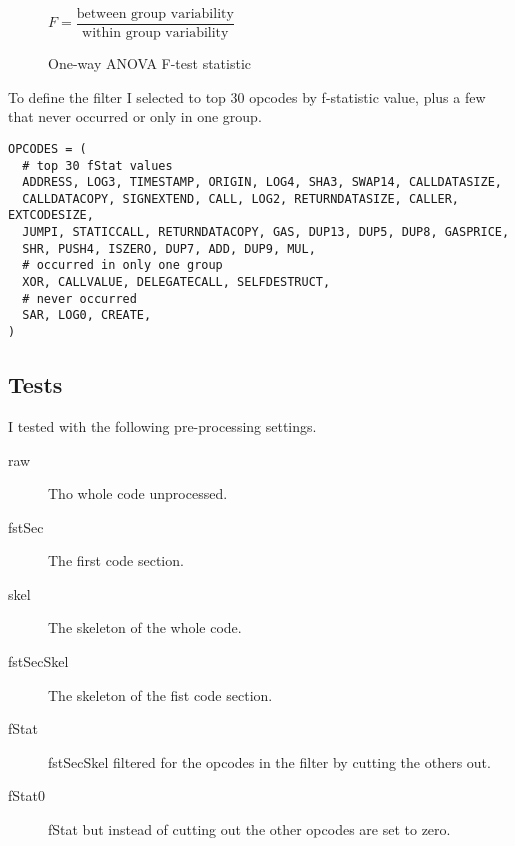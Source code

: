 \documentclass[../main.tex]{subfiles}
\begin{document}
\begin{figure}[ht!]
  \centering
  \begin{math}
    F = \dfrac{\textrm{between group variability}}{\textrm{within group variability}}
  \end{math}
  \caption{One-way ANOVA F-test statistic}
  \label{fig:ftest}
\end{figure}

To define the  filter I selected to top 30 opcodes by f-statistic value, plus a few that never occurred or only in one group.

\begin{lstlisting}[style=pymd]
OPCODES = (
  # top 30 fStat values
  ADDRESS, LOG3, TIMESTAMP, ORIGIN, LOG4, SHA3, SWAP14, CALLDATASIZE,
  CALLDATACOPY, SIGNEXTEND, CALL, LOG2, RETURNDATASIZE, CALLER, EXTCODESIZE,
  JUMPI, STATICCALL, RETURNDATACOPY, GAS, DUP13, DUP5, DUP8, GASPRICE,
  SHR, PUSH4, ISZERO, DUP7, ADD, DUP9, MUL,
  # occurred in only one group
  XOR, CALLVALUE, DELEGATECALL, SELFDESTRUCT,
  # never occurred
  SAR, LOG0, CREATE,
)
\end{lstlisting}

\subsection{Tests}
I tested with the following pre-processing settings.

\begin{description}
  \item[raw] Tho whole code unprocessed.
  \item[fstSec] The first code section.
  \item[skel] The skeleton of the whole code.
  \item[fstSecSkel] The skeleton of the fist code section.
  \item[fStat] fstSecSkel filtered for the opcodes in the  filter by cutting the others out.
  \item[fStat0] fStat but instead of cutting out the other opcodes are set to zero.
\end{description}
\end{document}
